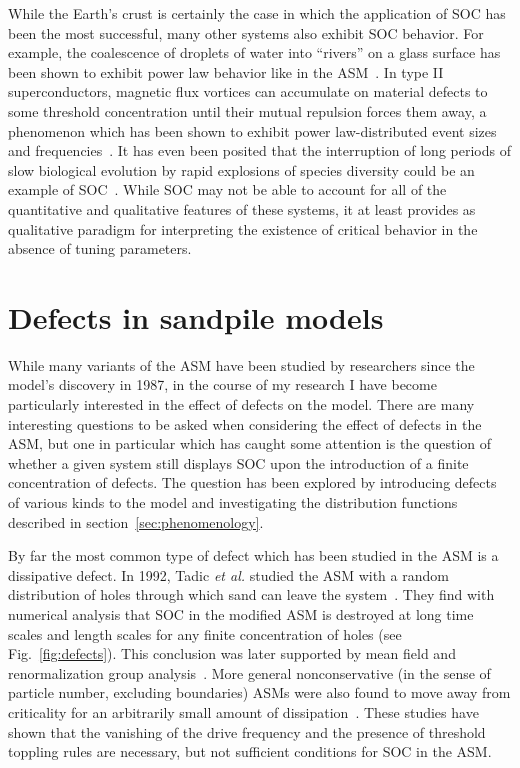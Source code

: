 \documentclass[aps,prb,reprint,superscriptaddress]{revtex4-2}
\begin{document}
While the Earth's crust is certainly the case in which the application of SOC has been the most successful, many other systems also exhibit SOC behavior. For example, the coalescence of droplets of water into ``rivers'' on a glass surface has been shown to exhibit power law behavior like in the ASM~\cite{jensen, plourde_water_1993}. In type II superconductors, magnetic flux vortices can accumulate on material defects to some threshold concentration until their mutual repulsion forces them away, a phenomenon which has been shown to exhibit power law-distributed event sizes and frequencies~\cite{field_superconducting_1995}. It has even been posited that the interruption of long periods of slow biological evolution by rapid explosions of species diversity could be an example of SOC~\cite{raup_biological_1986}. While SOC may not be able to account for all of the quantitative and qualitative features of these systems, it at least provides as qualitative paradigm for interpreting the existence of critical behavior in the absence of tuning parameters.

\section{Defects in sandpile models}

While many variants of the ASM have been studied by researchers since the model's discovery in 1987, in the course of my research I have become particularly interested in the effect of defects on the model. There are many interesting questions to be asked when considering the effect of defects in the ASM, but one in particular which has caught some attention is the question of whether a given system still displays SOC upon the introduction of a finite concentration of defects. The question has been explored by introducing defects of various kinds to the model and investigating the distribution functions described in section~\ref{sec:phenomenology}.

By far the most common type of defect which has been studied in the ASM is a dissipative defect. In 1992, Tadic \textit{et al.} studied the ASM with a random distribution of holes through which sand can leave the system~\cite{tadic_scaling_1992}. They find with numerical analysis that SOC in the modified ASM is destroyed at long time scales and length scales for any finite concentration of holes (see Fig.~\ref{fig:defects}). This conclusion was later supported by mean field and renormalization group analysis~\cite{ghaffari_nonconservative_1997}. More general nonconservative (in the sense of particle number, excluding boundaries) ASMs were also found to move away from criticality for an arbitrarily small amount of dissipation~\cite{tsuchiya_proof_2000}. These studies have shown that the vanishing of the drive frequency and the presence of threshold toppling rules are necessary, but not sufficient conditions for SOC in the ASM.
\end{document}
